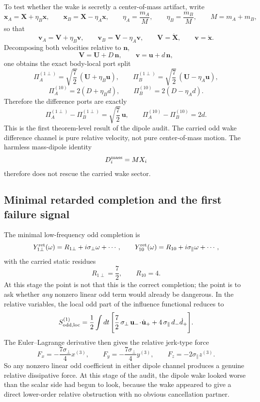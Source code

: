 \documentclass[11pt]{article}
\begin{document}
To test whether the wake is secretly a center-of-mass artifact, write
\[
\mathbf x_A=\mathbf X+\eta_B\mathbf x,
\qquad
\mathbf x_B=\mathbf X-\eta_A\mathbf x,
\qquad
\eta_A=\frac{m_A}{M},
\qquad
\eta_B=\frac{m_B}{M},
\qquad
M=m_A+m_B,
\]
so that
\[
\mathbf v_A=\mathbf V+\eta_B\mathbf v,
\qquad
\mathbf v_B=\mathbf V-\eta_A\mathbf v,
\qquad
\mathbf V=\dot{\mathbf X},
\qquad
\mathbf v=\dot{\mathbf x}.
\]
Decomposing both velocities relative to $\mathbf n$,
\[
\mathbf V=\mathbf U+D\,\mathbf n,
\qquad
\mathbf v=\mathbf u+d\,\mathbf n,
\]
one obtains the exact body-local port split
\[
\Pi_A^{(1\perp)}=\sqrt{\frac72}\,(\mathbf U+\eta_B\mathbf u),
\qquad
\Pi_B^{(1\perp)}=\sqrt{\frac72}\,(\mathbf U-\eta_A\mathbf u),
\]
\[
\Pi_A^{(10)}=2(D+\eta_B d),
\qquad
\Pi_B^{(10)}=2(D-\eta_A d).
\]
Therefore the difference ports are exactly
\[
\boxed{\Pi_A^{(1\perp)}-\Pi_B^{(1\perp)}=\sqrt{\frac72}\,\mathbf u,}
\qquad
\boxed{\Pi_A^{(10)}-\Pi_B^{(10)}=2d.}
\]
This is the first theorem-level result of the dipole audit.  The carried odd
wake difference channel is pure relative velocity, not pure center-of-mass
motion.  The harmless mass-dipole identity
\[
D_i^{\rm mass}=MX_i
\]
therefore does not rescue the carried wake sector.

\subsection{Minimal retarded completion and the first failure signal}
\label{app:dipole-ledger-minimal-retarded}

The minimal low-frequency odd completion is
\[
Y_{1\perp}^{\rm ret}(\omega)=R_{1\perp}+i\sigma_\perp\omega+\cdots,
\qquad
Y_{10}^{\rm ret}(\omega)=R_{10}+i\sigma_\parallel\omega+\cdots,
\]
with the carried static residues
\[
R_{1\perp}=\frac72,
\qquad
R_{10}=4.
\]
At this stage the point is not that this is the correct completion; the point is
to ask whether \emph{any} nonzero linear odd term would already be dangerous.
In the relative variables, the local odd part of the influence functional
reduces to
\[
S^{(1)}_{\rm odd,loc}
=
\frac12\int dt\,
\Bigg[
\frac72\,\sigma_\perp\,\mathbf u_-\!\cdot\!\dot{\mathbf u}_+
+
4\,\sigma_\parallel\,d_-\dot d_+
\Bigg].
\]
The Euler--Lagrange derivative then gives the relative jerk-type force
\[
F_x=-\frac{7\sigma_\perp}{4}x^{(3)},
\qquad
F_y=-\frac{7\sigma_\perp}{4}y^{(3)},
\qquad
F_z=-2\sigma_\parallel z^{(3)}.
\]
So any nonzero linear odd coefficient in either dipole channel produces a
genuine relative dissipative force.  At this stage of the audit, the dipole
wake looked worse than the scalar side had begun to look, because the wake
appeared to give a direct lower-order relative obstruction with no obvious
cancellation partner.
\end{document}
